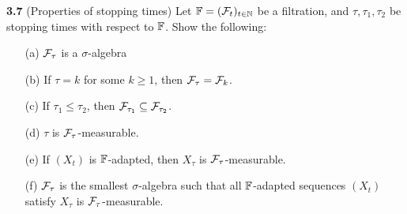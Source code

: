 \noindent\textbf{3.7} (Properties of stopping times) Let $\mathbb{F} = (\mathcal{F}_t)_{t \in \mathbb{N}}$ be a filtration, and $\tau,\tau_1,\tau_2$ be stopping times with respect to $\mathbb{F}$. Show the following:


\begin{enumerate}
   \item[(a)] $\mathcal{F}_\tau$ is a $\sigma$-algebra
   \item[(b)] If $\tau =k$ for some $k\ge 1$, then $\mathcal{F}_\tau = \mathcal{F}_k$.
   \item[(c)] If $\tau_1 \le \tau_2$, then $\mathcal{F}_{\tau_1} \subseteq \mathcal{F}_{\tau_2}$.
   \item[(d)] $\tau$ is $\mathcal{F}_\tau$-measurable.
   \item[(e)] If $(X_t)$ is $\mathbb{F}$-adapted, then $X_\tau$ is $\mathcal{F}_\tau$-measurable.
   \item[(f)] $\mathcal{F}_\tau$ is the smallest $\sigma$-algebra such that all $\mathbb{F}$-adapted sequences $(X_t)$ satisfy $X_\tau$ is $\mathcal{F}_\tau$-measurable.
\end{enumerate}


